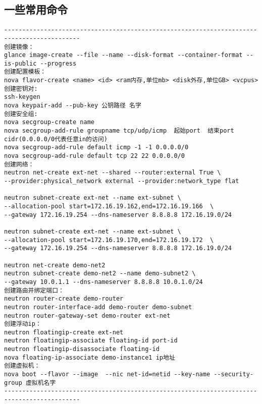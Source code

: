 \documentclass[a4paper,left=1.5cm,right=1.5cm,11pt]{article}
\begin{document}
\subsection{一些常用命令}
\begin{lstlisting}
-------------------------------------------------------------------------------------------
创建镜像：
glance image-create --file --name --disk-format --container-format --is-public --progress
创建配置模板：
nova flavor-create <name> <id> <ram内存,单位mb> <disk外存,单位GB> <vcpus>
创建密钥对:
ssh-keygen
nova keypair-add --pub-key 公钥路径 名字
创建安全组:
nova secgroup-create name
nova secgroup-add-rule groupname tcp/udp/icmp  起始port  结束port  cidr(0.0.0.0/0代表任意in的访问) 
nova secgroup-add-rule default icmp -1 -1 0.0.0.0/0
nova secgroup-add-rule default tcp 22 22 0.0.0.0/0
创建网络：
neutron net-create ext-net --shared --router:external True \
--provider:physical_network external --provider:network_type flat

neutron subnet-create ext-net --name ext-subnet \
--allocation-pool start=172.16.19.162,end=172.16.19.166  \
--gateway 172.16.19.254 --dns-nameserver 8.8.8.8 172.16.19.0/24

neutron subnet-create ext-net --name ext-subnet \
--allocation-pool start=172.16.19.170,end=172.16.19.172  \
--gateway 172.16.19.254 --dns-nameserver 8.8.8.8 172.16.19.0/24

neutron net-create demo-net2
neutron subnet-create demo-net2 --name demo-subnet2 \
--gateway 10.0.1.1 --dns-nameserver 8.8.8.8 10.0.1.0/24
创建路由并绑定端口：
neutron router-create demo-router
neutron router-interface-add demo-router demo-subnet
neutron router-gateway-set demo-router ext-net
创建浮动ip：
neutron floatingip-create ext-net
neutron floatingip-associate floating-id port-id
neutron floatingip-disassociate floating-id
nova floating-ip-associate demo-instance1 ip地址
创建虚拟机：
nova boot --flavor --image  --nic net-id=netid --key-name --security-group 虚拟机名字
-------------------------------------------------------------------------------------------
\end{lstlisting}
\end{document}
